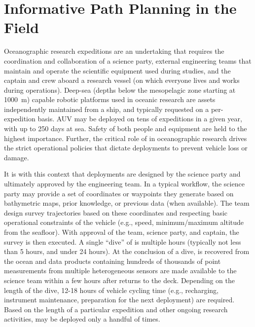 \section{Informative Path Planning in the Field}
Oceanographic research expeditions are an undertaking that requires the coordination and collaboration of a science party, external engineering teams that maintain and operate the scientific equipment used during studies, and the captain and crew aboard a research vessel (on which everyone lives and works during operations). Deep-sea (depths below the mesopelagic zone starting at \SI{1000}{\meter}) capable robotic platforms used in oceanic research are assets independently maintained from a ship, and typically requested on a per-expedition basis. AUV \Sentry may be deployed on tens of expeditions in a given year, with up to 250 days at sea. Safety of both people and equipment are held to the highest importance. Further, the critical role of \Sentry in oceanographic research drives the strict operational policies that dictate \Sentry deployments to prevent vehicle loss or damage.

It is with this context that \Sentry deployments are designed by the science party and ultimately approved by the \Sentry engineering team. In a typical workflow, the science party may provide a set of coordinates or waypoints they generate based on bathymetric maps, prior knowledge, or previous data (when available). The \Sentry team design survey trajectories based on these coordinates and respecting basic operational constraints of the vehicle (e.g., speed, minimum/maximum altitude from the seafloor). With approval of the \Sentry team, science party, and captain, the survey is then executed. A single ``dive'' of \Sentry is multiple hours (typically not less than 5 hours, and under 24 hours). At the conclusion of a dive, \Sentry is recovered from the ocean and data products containing hundreds of thousands of point measurements from multiple heterogeneous sensors are made available to the science team within a few hours after \Sentry returns to the deck. Depending on the length of the dive, 12-18 hours of vehicle cycling time (e.g., recharging, instrument maintenance, preparation for the next deployment) are required. Based on the length of a particular expedition and other ongoing research activities, \Sentry may be deployed only a handful of times.

